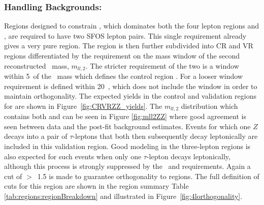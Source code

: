 
\subsubsection{Handling Backgrounds: \ZZ}
\label{sec:crzz}
Regions designed to constrain \ZZ, which dominates both the four lepton regions \SRFour and \SRFR, are required to have two SFOS lepton pairs.
This single requirement already gives a very pure \ZZ region.
The region is then further subdivided into CR and VR regions differentiated by the requirement on the mass window of the second reconstructed \Zboson\ mass, $ m_{ll,2} $.
The stricter requirement of the two is a window within 5~\gev of the \Zboson\ mass which defines the control region \CRZZ.
For \VRZZ a looser window requirement is defined within 20~\gev, which does not include the \CRZZ window in order to maintain orthogonality.
The expected yields in the control and validation regions for \ZZ are shown in Figure~\ref{fig:CRVRZZ_yields}.
The $m_{ll,2}$ distribution which contains both \CRZZ and \VRZZ can be seen in Figure \ref{fig:mll2ZZ} where good agreement is seen between data and the post-fit background estimates.
Events for which one $Z$ decays into a pair of $\tau$-leptons that both then subsequently decay leptonically are included in this validation region.
Good modeling in the three-lepton regions is also expected for such \ZZ events when only one $\tau$-lepton decays leptonically,
although this process is strongly suppressed by the \met\ and \mTmin requirements.
Again a cut of \dRbb$>$~1.5 is made to guarantee orthogonality to \ttZ regions.
The full definition of cuts for this region are shown in the region summary Table \ref{tab:regions:regionBreakdown} and illustrated in Figure~\ref{fig:4lorthogonality}. 
